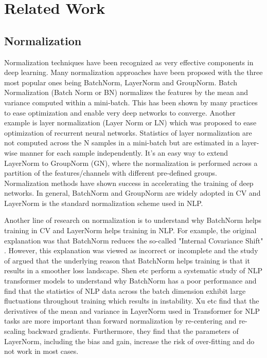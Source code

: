 \documentclass[sigconf]{acmart}
\begin{document}
\section{Related Work}
\subsection{Normalization}
Normalization techniques have been recognized as very effective components in deep learning. Many normalization approaches have been proposed with the three most popular ones being BatchNorm\cite{ioffe2015batch}, LayerNorm \cite{ba2016layer} and GroupNorm\cite{wu2018group}. Batch Normalization (Batch Norm or BN)\cite{ioffe2015batch} normalizes the features by the mean and variance computed within a mini-batch. This has been shown by many practices to ease optimization and enable very deep networks to converge. Another example is layer normalization (Layer Norm or LN)\cite{ba2016layer} which was proposed to ease optimization of recurrent neural networks. Statistics of layer normalization are not computed across the N samples in a mini-batch but are estimated in a layer-wise manner for each sample independently. It's an easy way to  extend LayerNorm to GroupNorm (GN)\cite{wu2018group}, where the normalization is performed across a partition of the features/channels with different pre-defined groups. Normalization methods have shown success in accelerating the training of deep networks. In general, BatchNorm \cite{ioffe2015batch} and GroupNorm \cite{wu2018group} are widely adopted in CV and LayerNorm  \cite{ba2016layer} is the standard normalization scheme used in NLP.


Another line of research on normalization is to understand why BatchNorm helps training in CV and LayerNorm helps training in NLP. For example, the original explanation was that BatchNorm reduces the so-called "Internal Covariance Shift" \cite{ioffe2015batch}. However, this explanation was viewed as incorrect or incomplete and the study of \cite{santurkar2018does} argued that the underlying reason that BatchNorm helps training is that it results in a smoother loss landscape. Shen etc \cite{shen2020rethinking} perform a systematic study of NLP transformer models to understand why BatchNorm has a poor performance and find that the statistics of NLP data across the batch dimension exhibit large fluctuations throughout training which results in instability. Xu etc \cite{xu2019understanding} find that the derivatives of the mean and variance in LayerNorm used in Transformer for NLP tasks are more important than forward normalization by re-centering and re-scaling backward gradients. Furthermore, they find that the parameters of LayerNorm, including the bias and gain, increase the risk of over-fitting and do not work in most cases.
\end{document}
